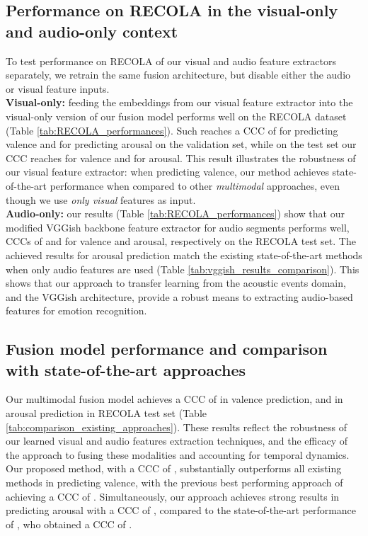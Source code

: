 \documentclass[times,twocolumn,final,authoryear]{elsarticle}
\begin{document}
	
	
	
	
	\subsection{Performance on RECOLA in the visual-only and audio-only context}
	To test performance on RECOLA of our visual and audio feature extractors separately, we retrain the same fusion architecture, but disable either the audio or visual feature inputs.\\
	
	
	\textbf{Visual-only:} feeding the embeddings from our visual feature extractor into the visual-only version of our fusion model performs well on the RECOLA dataset (Table \ref{tab:RECOLA_performances}). Such reaches a CCC of  for predicting valence and  for predicting arousal on the validation set, while on the test set our CCC reaches  for valence and  for arousal. This result illustrates the robustness of our visual feature extractor: when predicting valence, our method achieves state-of-the-art performance when compared to other \textit{multimodal} approaches, even though we use \textit{only visual} features as input.\\
	\textbf{Audio-only:} our results (Table \ref{tab:RECOLA_performances}) show that our modified VGGish backbone feature extractor for audio segments performs well, CCCs of  and  for valence and arousal, respectively on the RECOLA test set. The achieved results for arousal prediction match the existing state-of-the-art methods when only audio features are used (Table \ref{tab:vggish_results_comparison}). This shows that our approach to transfer learning from the acoustic events domain, and the VGGish architecture, provide a robust means to extracting audio-based features for emotion recognition.
	
	\subsection{Fusion model performance and comparison with state-of-the-art approaches}
	
	Our multimodal fusion model achieves a CCC of  in valence prediction, and  in arousal prediction in RECOLA test set (Table \ref{tab:comparison_existing_approaches}). These results reflect the robustness of our learned visual and audio features extraction techniques, and the efficacy of the approach to fusing these modalities and accounting for temporal dynamics. Our proposed method, with a CCC of , substantially outperforms all existing methods in predicting valence, with the previous best performing approach of \cite{Tzarakis2017} achieving a CCC of . Simultaneously, our approach achieves strong results in predicting arousal with a CCC of , compared to the state-of-the-art performance of \cite{Ringeval2015}, who obtained a CCC of .
	
\end{document}
